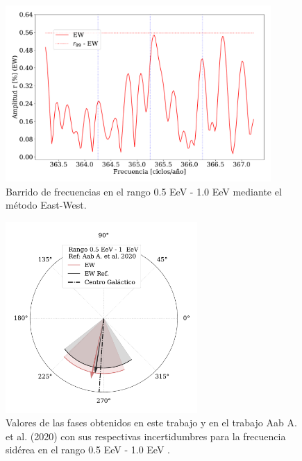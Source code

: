 \documentclass[11pt, letterpaper,oneside]{article}
\begin{document}
\begin{figure}[H]
    \begin{small}
        \begin{center}
            \vspace*{-1.6 cm}
            \includegraphics[width=0.9\textwidth]{Figs/plot_bin_2_barrido_v3_EW.pdf}
            \vspace*{-0.6 cm}
        \end{center}
        \caption{Barrido de frecuencias en el  rango 0.5 EeV - 1.0 EeV mediante el método East-West.}
        \label{fig:segundo_barrido}
    \end{small}
\end{figure}    


\begin{figure}[H]
    \begin{small}
        \begin{center}
            \vspace*{-0.65 cm}
            \includegraphics[width=0.65\textwidth]{Figs/phase_segundo_bin_v3.pdf}
            \vspace*{-1.1 cm}
        \end{center}
        \caption{Valores de las fases obtenidos en este trabajo y en el trabajo Aab A.  et al. (2020) \cite{Aab_2020} con sus respectivas incertidumbres para la frecuencia sidérea en el rango 0.5 EeV - 1.0 EeV .}
        \label{fig:segundo}
    \end{small}
\end{figure}
\end{document}
